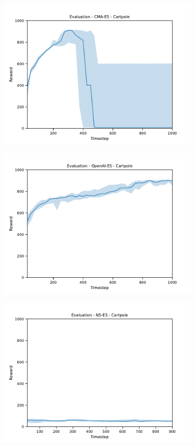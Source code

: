 \begin{figure}[H]
    \includegraphics[width=0.9\textwidth]{img/eval-cart-cmaes.pdf}
\end{figure}
\begin{figure}[H]
    \includegraphics[width=0.9\textwidth]{img/eval-cart-open.pdf}
\end{figure}
\begin{figure}[H]
    \includegraphics[width=0.9\textwidth]{img/eval-cart-nses.pdf}
\end{figure}
